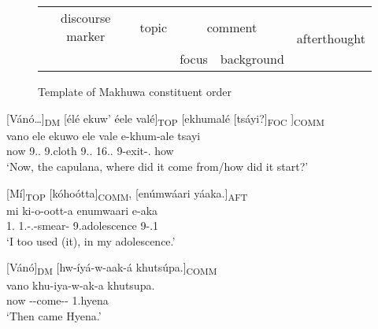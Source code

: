 \documentclass[output=paper]{langscibook}
\begin{document}
\begin{figure}
\begin{tabular}{c c c c |c|}
\hline
\multicolumn{1}{|c}{discourse marker} & \multicolumn{1}{|c}{topic} & \multicolumn{2}{|c|}{comment} & \multirow{2}{*}{afterthought}\\
\cline{1-4}
&  & \multicolumn{1}{|c|}{focus} & background & \\
\cline{3-5}
\end{tabular}
\caption{Template of Makhuwa constituent order}
\label{fig:makhuwawo}
\end{figure}

\ea
\label{bkm:Ref129852497}
{}[Vánó…]\textsubscript{DM} [élé ekuw’ éele valé]\textsubscript{TOP} [ekhumalé [tsáyi?]\textsubscript{FOC} ]\textsubscript{COMM}\\
\gll
vano  ele  ekuwo  ele  vale  e-khum-ale  tsayi\\
now  9.\DEM{}.\DIST{}  9.cloth  9.\DEM{}.\DIST{}  16.\DEM{}.\DIST{}  9\SM{}-exit-\PFV{}.\CJ{}  how\\
\glt
‘Now, the capulana, where did it come from/how did it start?’\\

\z

\ea
{}[Mí]\textsubscript{TOP} [kóhoótta]\textsubscript{COMM}, [enúmwáari yáaka.]\textsubscript{AFT}\\
\gll
mi  ki-o-oott-a  enumwaari  e-aka\\
1\SG{}.\PRO{}  1\SG{}.\SM{}-\PFV{}.\DJ{}-smear-\FV{}  9.adolescence  9-\POSS{}.1\SG{}\\
\glt
‘I too used (it), in my adolescence.’\\

\z

\ea
{}[Vánó]\textsubscript{DM}  [hw-íyá-w-aak-á  khutsúpa.]\textsubscript{COMM}\\
\gll
vano  khu-iya-w-ak-a  khutsupa.\\
now  \NARR{}-\IPFV{}-come-\DUR{}-\FV{}  1.hyena\\
\glt
‘Then came Hyena.’\\
\end{document}

